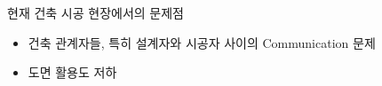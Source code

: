 

현재 건축 시공 현장에서의 문제점 
\begin{itemize} 
\item 건축 관계자들, 특히 설계자와 시공자 사이의 Communication 문제
\item 도면 활용도 저하 
\end{itemize}